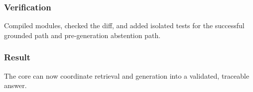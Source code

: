 \subsubsection{Verification}

Compiled modules, checked the diff, and added isolated tests for the successful grounded path and pre-generation abstention path.

\subsubsection{Result}

The core can now coordinate retrieval and generation into a validated, traceable answer.

